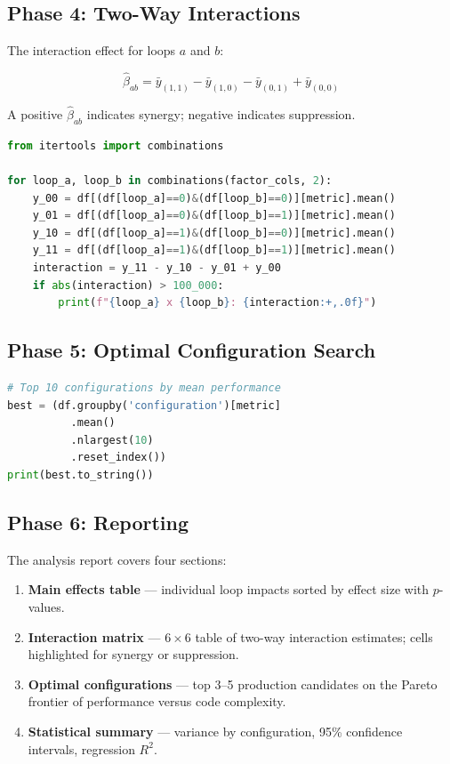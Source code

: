 \subsection{Phase 4: Two-Way Interactions}

The interaction effect for loops $a$ and $b$:

\begin{equation}
  \hat{\beta}_{ab} = \bar{y}_{(1,1)} - \bar{y}_{(1,0)} - \bar{y}_{(0,1)} + \bar{y}_{(0,0)}
\end{equation}

A positive $\hat{\beta}_{ab}$ indicates synergy; negative indicates suppression.

\begin{lstlisting}[language=Python]
from itertools import combinations

for loop_a, loop_b in combinations(factor_cols, 2):
    y_00 = df[(df[loop_a]==0)&(df[loop_b]==0)][metric].mean()
    y_01 = df[(df[loop_a]==0)&(df[loop_b]==1)][metric].mean()
    y_10 = df[(df[loop_a]==1)&(df[loop_b]==0)][metric].mean()
    y_11 = df[(df[loop_a]==1)&(df[loop_b]==1)][metric].mean()
    interaction = y_11 - y_10 - y_01 + y_00
    if abs(interaction) > 100_000:
        print(f"{loop_a} x {loop_b}: {interaction:+,.0f}")
\end{lstlisting}

\subsection{Phase 5: Optimal Configuration Search}

\begin{lstlisting}[language=Python]
# Top 10 configurations by mean performance
best = (df.groupby('configuration')[metric]
          .mean()
          .nlargest(10)
          .reset_index())
print(best.to_string())
\end{lstlisting}

\subsection{Phase 6: Reporting}

The analysis report covers four sections:

\begin{enumerate}
  \item \textbf{Main effects table} — individual loop impacts sorted by effect
        size with $p$-values.
  \item \textbf{Interaction matrix} — $6 \times 6$ table of two-way interaction
        estimates; cells highlighted for synergy or suppression.
  \item \textbf{Optimal configurations} — top 3--5 production candidates on the
        Pareto frontier of performance versus code complexity.
  \item \textbf{Statistical summary} — variance by configuration, 95\%
        confidence intervals, regression $R^2$.
\end{enumerate}

